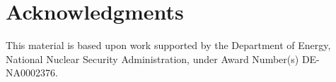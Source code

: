 \documentclass{anstrans}
\begin{document}
\section{Acknowledgments}
This material is based upon work supported by the Department of Energy, National Nuclear Security Administration, under Award Number(s) DE-NA0002376.


\end{document}
